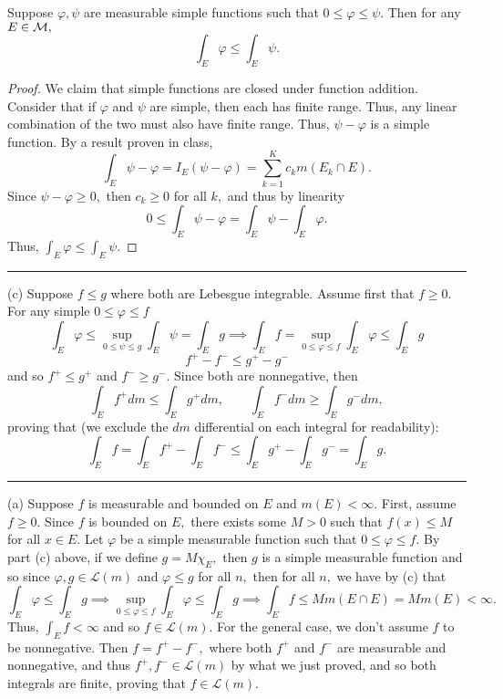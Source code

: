 \documentclass[11pt]{article}
\begin{document}
\begin{solution}
\begin{lemma}
    Suppose $\varphi, \psi$ are measurable simple functions such that $ 0 \leq \varphi \leq \psi.$ Then  for any $E \in \cal M,$ 
    \[\int_E \varphi  \leq \int_E \psi.\]
\end{lemma}
\begin{proof}
   We claim that simple functions are closed under function addition. Consider that if $\varphi$ and $\psi$ are simple, then each has finite range. Thus, any linear combination of the two must also have finite range. Thus, $\psi - \varphi$ is a simple function. By a result proven in class,
   \[\int_E \psi - \varphi = I_E(\psi - \varphi) = \sum_{k=1}^K c_k m(E_k \cap E).\] Since $\psi - \varphi \geq 0,$ then $c_k \geq 0$ for all $k,$ and thus by linearity 
   \[0 \leq \int_E \psi - \varphi = \int_E \psi - \int_E \varphi.\]  Thus, $\int_E \varphi \leq \int_E \psi.$ 
\end{proof}

\rule{\linewidth}{0.4pt}

(c) Suppose $f \leq g$ where both are Lebesgue integrable. Assume first that $ f\geq 0.$ For any simple $0\leq \varphi\leq f$
\[\int_E \varphi \leq \sup_{0\leq \psi \leq g}\int_E \psi = \int_E g \implies \int_E f = \sup_{0 \leq \varphi \leq f}\int_E\varphi \leq \int_E g\] 
\[f^+ - f^- \leq g^+ - g^-\] and so $f^+ \leq g^+$ and $f^- \geq g^-.$ Since both are nonnegative, then 
\[\int_E f^+dm \leq \int_E g^+dm, \qquad \int_E f^-dm \geq \int_E g^- dm,\] proving that (we exclude the $dm$ differential on each integral for readability):
\[\int_E f = \int_E f^+ - \int_E f^- \leq \int_E g^+ - \int_E g^- = \int_E g.\]

\rule{\linewidth}{0.4pt}

(a) Suppose $f$ is measurable and bounded on $E$ and $m(E) < \infty.$ First, assume $f\geq 0.$ Since $f$ is bounded on $E,$ there exists some $M >0$ such that $f(x) \leq M$ for all $x\in E.$ Let $\varphi$ be a simple measurable function such that $0\leq \varphi \leq f.$ By part (c) above, if we define $g = M \chi_{E},$ then $g$ is a simple measurable function and so since $ \varphi, g \in \mathcal{L}(m)$  and $\varphi \leq g$ for all $n,$ then for all $n,$ we have by (c) that
\[\int_E \varphi \leq \int_E g \implies \sup_{0 \leq \varphi \leq f}\int_E \varphi \leq \int_Eg \implies \int_E f \leq M m(E \cap E) = Mm(E) < \infty.\] Thus, $\int_E f < \infty$ and so $f \in \mathcal{L}(m).$ For the general case, we don't assume $f$ to be nonnegative. Then $f = f^+ - f^-,$ where both $f^+$ and $f^-$ are measurable and nonnegative, and thus $f^+, f^- \in \mathcal{L}(m)$ by what we just proved, and so both integrals are finite, proving that $f \in \mathcal{L}(m).$


\end{solution}
\end{document}
